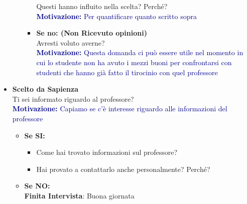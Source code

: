 \begin{itemize}
\begin{enumerate}
\begin{itemize}
            Questi hanno influito nella scelta? Perché?\\
            \textcolor{darkblue}{\textbf{Motivazione:} Per quantificare quanto scritto sopra}
            \item \textbf{Se no: (Non Ricevuto opinioni)}\\
            Avresti voluto averne?\\
            \textcolor{darkblue}{\textbf{Motivazione:} Questa domanda ci può essere utile nel momento in cui lo studente non ha avuto i mezzi buoni per confrontarsi con studenti 
            che hanno già fatto il tirocinio con quel professore}
        \end{itemize}
    \end{enumerate}
    \item \textbf{Scelto da Sapienza}\\
    Ti sei informato riguardo al professore?\\
    \textcolor{darkblue}{\textbf{Motivazione:} Capiamo se c'è interesse riguardo alle informazioni del professore}
    \begin{itemize}
        \item \textbf{Se SI:}
        \begin{itemize}
            \item Come hai trovato informazioni sul professore?
            \item Hai provato a contattarlo anche personalmente? Perché?
            
        \end{itemize}

        \item \textbf{Se NO:}\\
        \textbf{Finita Intervista}: Buona giornata
    \end{itemize}

\end{itemize}



